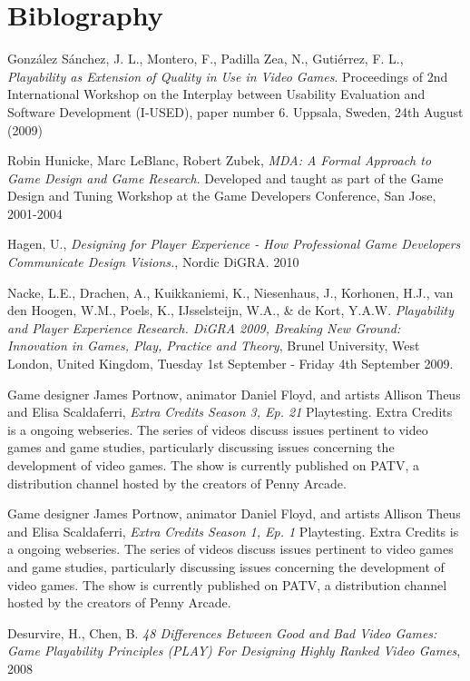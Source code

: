 \section{Biblography}



\begin{thebibliography}{9}

  González Sánchez, J. L., Montero, F., Padilla Zea, N., Gutiérrez, F. L.,
  \emph{Playability as Extension of Quality in Use in Video Games}.
  Proceedings of 2nd International Workshop on the Interplay between
  Usability Evaluation and Software Development (I-USED), paper number 6.
  Uppsala, Sweden,
  24th August (2009)


  Robin Hunicke, Marc LeBlanc, Robert Zubek,
  \emph{MDA: A Formal Approach to Game Design and Game Research}.
  Developed and taught as part of the Game Design and Tuning
  Workshop at the Game Developers Conference,
  San Jose,
  2001-2004

  Hagen, U.,
  \emph{Designing for Player Experience - How Professional Game Developers
    Communicate Design Visions.},
  Nordic DiGRA.
  2010

  Nacke, L.E., Drachen, A., Kuikkaniemi, K., Niesenhaus, J.,
  Korhonen, H.J., van den Hoogen, W.M., Poels, K., IJsselsteijn, W.A., \&
  de Kort, Y.A.W.
  \emph{Playability and Player Experience Research. DiGRA 2009, Breaking New Ground:
    Innovation in Games, Play, Practice and Theory},
  Brunel University, West London, United Kingdom,
  Tuesday 1st September - Friday 4th September 2009.

  Game designer James Portnow, animator Daniel Floyd, and artists
  Allison Theus and Elisa Scaldaferri,
  \emph{Extra Credits Season 3, Ep. 21}
  Playtesting. Extra Credits is a ongoing webseries. The series of
  videos discuss issues pertinent to video games and game studies,
  particularly discussing issues concerning the development of video
  games. The show is currently published on PATV, a distribution channel
  hosted by the creators of Penny Arcade.

  Game designer James Portnow, animator Daniel Floyd, and artists
  Allison Theus and Elisa Scaldaferri,
  \emph{Extra Credits Season 1, Ep. 1}
  Playtesting. Extra Credits is a ongoing webseries. The series of
  videos discuss issues pertinent to video games and game studies,
  particularly discussing issues concerning the development of video
  games. The show is currently published on PATV, a distribution channel
  hosted by the creators of Penny Arcade.

  Desurvire, H., Chen, B.
  \emph{48 Differences Between Good and Bad Video Games: Game Playability Principles
    (PLAY) For Designing Highly Ranked Video Games},
  2008

\end{thebibliography}
